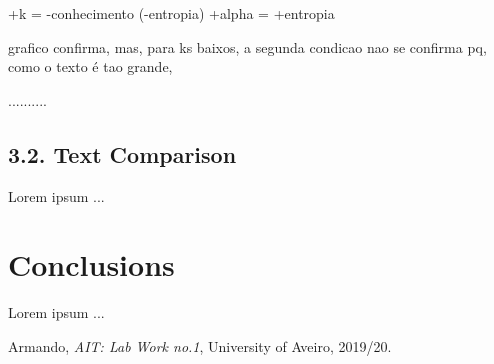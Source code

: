 \documentclass[12pt]{article}
\begin{document}
+k = -conhecimento (-entropia)
+alpha = +entropia

grafico confirma, mas, para ks baixos, a segunda condicao nao se confirma
pq, como o texto é tao grande, 

..........

\subsection*{3.2. Text Comparison}

Lorem ipsum ...

\section*{Conclusions}

Lorem ipsum ...

\begin{thebibliography}{9}
  

    Armando,
    \textit{AIT: Lab Work no.1},
    University of Aveiro,
    2019/20.
  
\end{thebibliography}





\end{document}
